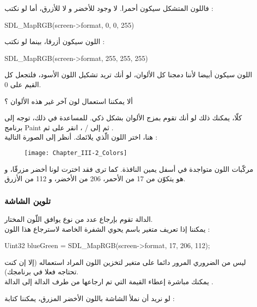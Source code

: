 فاللون المتشكل سيكون أحمرا. لا وجود للأخضر و لا للأزرق، أما لو نكتب :
\begin{Csource}
SDL_MapRGB(screen->format, 0, 0, 255)
\end{Csource}
اللون سيكون أزرقا، بينما لو نكتب :
\begin{Csource}
SDL_MapRGB(screen->format, 255, 255, 255)
\end{Csource}

اللون سيكون أبيضا لأننا دمجنا كل الألوان، لو أنك تريد تشكيل اللون الأسود، فلتجعل كل القيم على 0.

\begin{question}
ألا يمكننا استعمال لون آخر غير هذه الألوان ؟
\end{question}

كلّا، يمكنك ذلك لو أنك تقوم بمزج الألوان بشكل ذكي. للمساعدة في ذلك، توجه إلى برنامج
\textenglish{Paint}
ثم إلى
 / ،
انقر على
ثم
.\\
هنا، اختر اللون الّذي يلائمك. أنظر إلى الصورة التالية :

\begin{figure}[H]
	\centering
	\texttt{[image: Chapter\_III-2\_Colors]}
\end{figure}

مركّبات اللون متواجدة في أسفل يمين النافذة. كما ترى فقد اخترت لونا أخضر مزرقّا، و هو يتكوّن من 17 من الأحمر، 206 من الأخضر، و 112 من الأزرق.
\subsubsection{تلوين الشاشة}

الدالة
تقوم بإرجاع عدد من نوع
يوافق اللّون المختار.\\
يمكننا إذا تعريف متغير باسم
يحوي الشفرة الخاصة لاسترجاع هذا اللون :

\begin{Csource}
Uint32 blueGreen = SDL_MapRGB(screen->format, 17, 206, 112);
\end{Csource}

ليس من الضروري المرور دائما على متغير لتخزين اللون المراد استعماله (إلا إن كنت تحتاجه فعلا في برنامجك).\\
يمكنك مباشرة إعطاء القيمة التي تم ارجاعها من طرف الدالة
إلى الدالة
.

لو نريد أن نملأ الشاشة باللون الأخضر المزرق، يمكننا كتابة :

